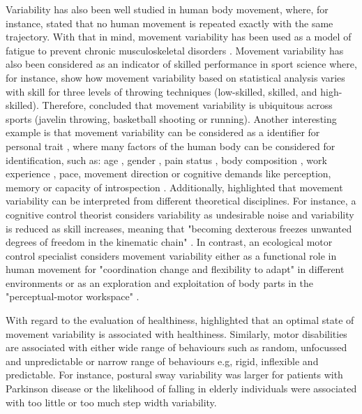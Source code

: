 Variability has also been well studied in human body movement, where, 
for instance, \cite{bernstein1967} stated that no human movement is 
repeated exactly with the same trajectory.
With that in mind, movement variability has been used as a model of fatigue 
to prevent chronic musculoskeletal disorders 
\citep{mathiassen2006, srinivasan2012}. 
Movement variability has also been considered as an indicator of skilled 
performance in sport science where, for instance, 
\cite{wagner2012} show how movement variability based on statistical 
analysis varies with skill for three levels of throwing techniques 
(low-skilled, skilled, and high-skilled).
Therefore, \cite{bartlett2007} concluded that movement variability is 
ubiquitous across sports (javelin throwing, basketball shooting or running).
Another interesting example is that movement variability can be considered 
as a identifier for personal trait \citep{sandlund2017}, 
where many factors of the human body can be considered for identification, 
such as:
age \citep{kruger2013, macdonald2006, vaillancourt2003, stergiou2016},
gender \citep{svendsen2010},
pain status \citep{madeleine2008, sandlund2008},
body composition  \citep{chiari2002},
work experience \citep{madeleine2009},
pace, movement direction or cognitive demands  
like perception, memory or capacity of introspection 
\citep{srinivasan2012, kanai2011}.
Additionally, \cite{bartlett2007} highlighted that movement variability 
can be interpreted from different theoretical disciplines.
For instance, a cognitive control theorist considers variability as 
undesirable noise and variability is reduced as skill increases, meaning 
that "becoming dexterous freezes unwanted degrees of freedom in the 
kinematic chain" \citep[p. 238]{bartlett2007}.
In contrast, an ecological motor control specialist considers movement 
variability either as a functional role in human movement for 
"coordination change and flexibility to adapt" in different 
environments \citep[p. 238]{bartlett2007} or 
as an exploration and exploitation of body parts in the 
"perceptual-motor workspace" \citep{wu2014, herzfeld2014}.

With regard to the evaluation of healthiness, \cite{stergiou2011} 
highlighted that an optimal state of movement variability is associated 
with healthiness. Similarly, motor disabilities are associated with either 
wide range of behaviours such as random, unfocussed and unpredictable or 
narrow range of behaviours e.g, rigid, inflexible and predictable. 
For instance, postural sway variability was larger for patients with 
Parkinson disease or the likelihood of falling in elderly individuals 
were associated with too little or too much step width variability.


